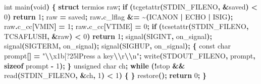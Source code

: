 \documentclass[
  oneside,
  openany]{book}
\newenvironment{Shaded}{\begin{snugshade}}{\end{snugshade}}
\newcommand{\ControlFlowTok}[1]{\textcolor[rgb]{0.13,0.29,0.53}{\textbf{#1}}}
\newcommand{\DataTypeTok}[1]{\textcolor[rgb]{0.13,0.29,0.53}{#1}}
\newcommand{\DecValTok}[1]{\textcolor[rgb]{0.00,0.00,0.81}{#1}}
\newcommand{\KeywordTok}[1]{\textcolor[rgb]{0.13,0.29,0.53}{\textbf{#1}}}
\newcommand{\NormalTok}[1]{#1}
\newcommand{\OperatorTok}[1]{\textcolor[rgb]{0.81,0.36,0.00}{\textbf{#1}}}
\newcommand{\SpecialCharTok}[1]{\textcolor[rgb]{0.81,0.36,0.00}{\textbf{#1}}}
\newcommand{\StringTok}[1]{\textcolor[rgb]{0.31,0.60,0.02}{#1}}
\begin{document}
\begin{Shaded}
\begin{Highlighting}[]
\DataTypeTok{int}\NormalTok{ main}\OperatorTok{(}\DataTypeTok{void}\OperatorTok{)} \OperatorTok{\{}
    \KeywordTok{struct}\NormalTok{ termios raw}\OperatorTok{;}
    \ControlFlowTok{if} \OperatorTok{(}\NormalTok{tcgetattr}\OperatorTok{(}\NormalTok{STDIN\_FILENO}\OperatorTok{,} \OperatorTok{\&}\NormalTok{saved}\OperatorTok{)} \OperatorTok{\textless{}} \DecValTok{0}\OperatorTok{)} \ControlFlowTok{return} \DecValTok{1}\OperatorTok{;}
\NormalTok{    raw }\OperatorTok{=}\NormalTok{ saved}\OperatorTok{;}
\NormalTok{    raw}\OperatorTok{.}\NormalTok{c\_lflag }\OperatorTok{\&=} \OperatorTok{\textasciitilde{}(}\NormalTok{ICANON }\OperatorTok{|}\NormalTok{ ECHO }\OperatorTok{|}\NormalTok{ ISIG}\OperatorTok{);}
\NormalTok{    raw}\OperatorTok{.}\NormalTok{c\_cc}\OperatorTok{[}\NormalTok{VMIN}\OperatorTok{]} \OperatorTok{=} \DecValTok{1}\OperatorTok{;}\NormalTok{ raw}\OperatorTok{.}\NormalTok{c\_cc}\OperatorTok{[}\NormalTok{VTIME}\OperatorTok{]} \OperatorTok{=} \DecValTok{0}\OperatorTok{;}
    \ControlFlowTok{if} \OperatorTok{(}\NormalTok{tcsetattr}\OperatorTok{(}\NormalTok{STDIN\_FILENO}\OperatorTok{,}\NormalTok{ TCSAFLUSH}\OperatorTok{,} \OperatorTok{\&}\NormalTok{raw}\OperatorTok{)} \OperatorTok{\textless{}} \DecValTok{0}\OperatorTok{)} \ControlFlowTok{return} \DecValTok{1}\OperatorTok{;}
\NormalTok{    signal}\OperatorTok{(}\NormalTok{SIGINT}\OperatorTok{,}\NormalTok{ on\_signal}\OperatorTok{);}\NormalTok{ signal}\OperatorTok{(}\NormalTok{SIGTERM}\OperatorTok{,}\NormalTok{ on\_signal}\OperatorTok{);}\NormalTok{ signal}\OperatorTok{(}\NormalTok{SIGHUP}\OperatorTok{,}\NormalTok{ on\_signal}\OperatorTok{);}
    \OperatorTok{\{} \DataTypeTok{const} \DataTypeTok{char}\NormalTok{ prompt}\OperatorTok{[]} \OperatorTok{=} \StringTok{"}\SpecialCharTok{\textbackslash{}\textbackslash{}}\StringTok{x1b[?25lPress a key}\SpecialCharTok{\textbackslash{}\textbackslash{}}\StringTok{r}\SpecialCharTok{\textbackslash{}\textbackslash{}}\StringTok{n"}\OperatorTok{;}
\NormalTok{      write}\OperatorTok{(}\NormalTok{STDOUT\_FILENO}\OperatorTok{,}\NormalTok{ prompt}\OperatorTok{,} \KeywordTok{sizeof}\NormalTok{ prompt }\OperatorTok{{-}} \DecValTok{1}\OperatorTok{);} \OperatorTok{\}}
    \DataTypeTok{unsigned} \DataTypeTok{char}\NormalTok{ ch}\OperatorTok{;}
    \ControlFlowTok{while} \OperatorTok{(!}\NormalTok{stop }\OperatorTok{\&\&}\NormalTok{ read}\OperatorTok{(}\NormalTok{STDIN\_FILENO}\OperatorTok{,} \OperatorTok{\&}\NormalTok{ch}\OperatorTok{,} \DecValTok{1}\OperatorTok{)} \OperatorTok{\textless{}} \DecValTok{1}\OperatorTok{)} \OperatorTok{\{} \OperatorTok{\}}
\NormalTok{    restore}\OperatorTok{();}
    \ControlFlowTok{return} \DecValTok{0}\OperatorTok{;}
\OperatorTok{\}}
\end{Highlighting}
\end{Shaded}
\end{document}
